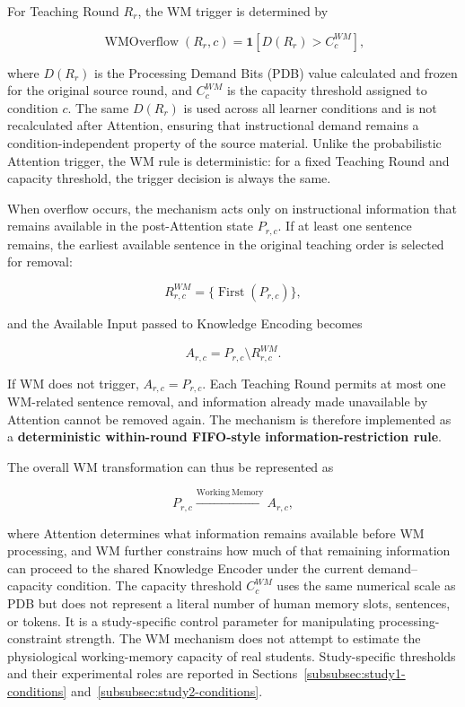 For Teaching Round $R_r$, the WM trigger is determined by

\[
\operatorname{WMOverflow}(R_r,c)
=
\mathbf{1}\left[D(R_r)>C^{WM}_c\right],
\]

where $D(R_r)$ is the Processing Demand Bits (PDB) value calculated and frozen for the original source round, and $C^{WM}_c$ is the capacity threshold assigned to condition $c$. The same $D(R_r)$ is used across all learner conditions and is not recalculated after Attention, ensuring that instructional demand remains a condition-independent property of the source material. Unlike the probabilistic Attention trigger, the WM rule is deterministic: for a fixed Teaching Round and capacity threshold, the trigger decision is always the same.

When overflow occurs, the mechanism acts only on instructional information that remains available in the post-Attention state $P_{r,c}$. If at least one sentence remains, the earliest available sentence in the original teaching order is selected for removal:

\[
R^{WM}_{r,c}
=
\{\operatorname{First}(P_{r,c})\},
\]

and the Available Input passed to Knowledge Encoding becomes

\[
A_{r,c}
=
P_{r,c}\setminus R^{WM}_{r,c}.
\]

If WM does not trigger, $A_{r,c}=P_{r,c}$. Each Teaching Round permits at most one WM-related sentence removal, and information already made unavailable by Attention cannot be removed again. The mechanism is therefore implemented as a \textbf{deterministic within-round FIFO-style information-restriction rule}.

The overall WM transformation can thus be represented as

\[
P_{r,c}
\xrightarrow{\mathrm{Working\ Memory}}
A_{r,c},
\]

where Attention determines what information remains available before WM processing, and WM further constrains how much of that remaining information can proceed to the shared Knowledge Encoder under the current demand--capacity condition. The capacity threshold $C^{WM}_c$ uses the same numerical scale as PDB but does not represent a literal number of human memory slots, sentences, or tokens. It is a study-specific control parameter for manipulating processing-constraint strength. The WM mechanism does not attempt to estimate the physiological working-memory capacity of real students. Study-specific thresholds and their experimental roles are reported in Sections~\ref{subsubsec:study1-conditions} and~\ref{subsubsec:study2-conditions}.

